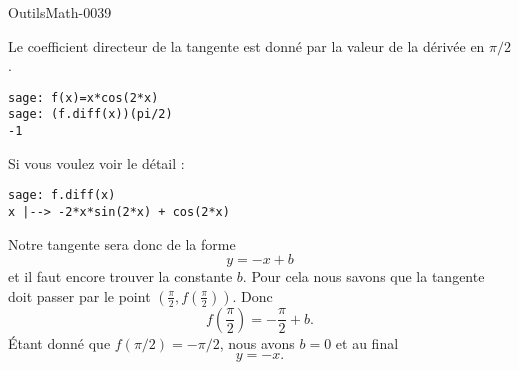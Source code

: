 
\begin{corrige}{OutilsMath-0039}

    Le coefficient directeur de la tangente est donné par la valeur de la dérivée en $\pi/2$.

    \begin{verbatim}
sage: f(x)=x*cos(2*x)
sage: (f.diff(x))(pi/2)
-1
    \end{verbatim}
    Si vous voulez voir le détail :
    \begin{verbatim}
sage: f.diff(x)
x |--> -2*x*sin(2*x) + cos(2*x)
    \end{verbatim}
    Notre tangente sera donc de la forme
    \begin{equation}
        y=-x+b
    \end{equation}
    et il faut encore trouver la constante $b$. Pour cela nous savons que la tangente doit passer par le point $(\frac{ \pi }{ 2 },f(\frac{ \pi }{ 2 }))$. Donc
    \begin{equation}
        f\left( \frac{ \pi }{ 2 } \right)=-\frac{ \pi }{ 2 }+b.
    \end{equation}
    Étant donné que $f(\pi/2)=-\pi/2$, nous avons $b=0$ et au final
    \begin{equation}
        y=-x.
    \end{equation}

\end{corrige}
